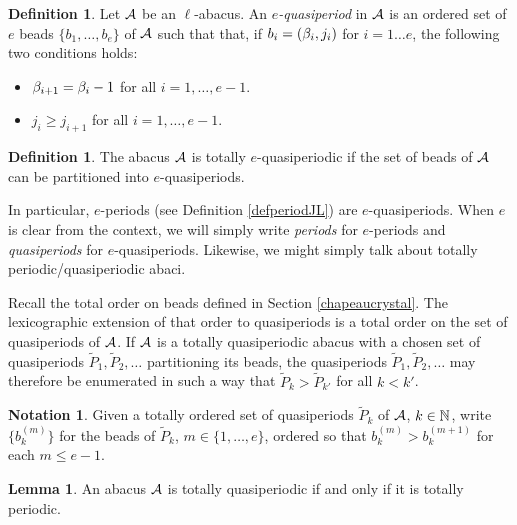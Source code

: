 \documentclass[12pt]{amsart}
\numberwithin{equation}{section}
\theoremstyle{definition}
\newtheorem{lemma}[equation]{Lemma}
\newtheorem{definition}[equation]{Definition}
\newtheorem{notation}[equation]{Notation}
\begin{document}
\begin{definition}\label{defquasiperiod}
Let $\mathcal{A}$ be an $\ell$-abacus.
An \textit{$e$-quasiperiod} in $\mathcal{A}$ is an ordered set of $e$ beads $\{b_1,\dots,b_e\}$ of $\mathcal{A}$ such that that, if $b_i=(\beta_i,j_i)$ for $i=1\dots e$, 
the following two conditions holds:
\begin{itemize}
 \item $\beta_{i+1}=\beta_i-1$ for all $i=1,\dots, e-1$.
 \item $j_i \geq j_{i+1}$ for all $i=1,\dots, e-1$.
 \end{itemize}
\end{definition}

\begin{definition} 
The abacus $\mathcal{A}$ is totally $e$-quasiperiodic if the set of beads of $\mathcal{A}$ 
can be partitioned into $e$-quasiperiods.
\end{definition}
In particular, $e$-periods (see Definition \ref{defperiodJL}) are $e$-quasiperiods. 
When $e$ is clear from the context, we will simply write \textit{periods} for $e$-periods and \textit{quasiperiods} for $e$-quasiperiods.
Likewise, we might simply talk about totally periodic/quasiperiodic abaci.

\medskip

Recall the total order on beads defined in Section \ref{chapeaucrystal}. The lexicographic extension of that order to quasiperiods is a total order on the set of quasiperiods of $\mathcal{A}$. %
If $\mathcal{A}$ is a totally quasiperiodic abacus with a chosen set of quasiperiods $\tilde{P}_1,\tilde{P}_2,\dots$ partitioning its beads, the quasiperiods $\tilde{P}_1,\tilde{P}_2,\dots$ may therefore be enumerated in such a way that $\tilde{P}_k>\tilde{P}_{k'}$ for all $k<k'$. 

\begin{notation}Given a totally ordered set of quasiperiods $\tilde{P}_k$ of $\mathcal{A}$, $k\in\mathbb{N}$, write $\{b_k^{(m)}\}$ for the beads of $\tilde{P}_k$, $m\in\{1,\dots,e\}$, ordered so that $b_k^{(m)}>b_k^{(m+1)}$ for each $m\leq e-1.$
\end{notation}

\begin{lemma}\label{lemqper=>per}
An abacus $\mathcal{A}$ is totally quasiperiodic if and only if it is totally periodic.
\end{lemma}
\end{document}
